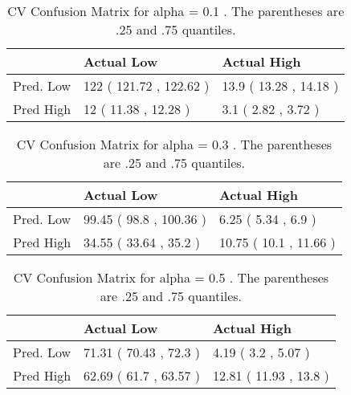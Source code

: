 \begin{table}[H]
\begin{center}
\begin{tabular}{rll}
  \hline
 & Actual Low & Actual High \\ 
  \hline
Pred. Low & 122 ( 121.72 , 122.62 ) & 13.9 ( 13.28 , 14.18 ) \\ 
  Pred High & 12 ( 11.38 , 12.28 ) & 3.1 ( 2.82 , 3.72 ) \\ 
   \hline
\end{tabular}
\caption{CV Confusion Matrix for alpha = 0.1 . The parentheses are .25 and .75 quantiles.}
\end{center}
\end{table}
\begin{table}[H]
\begin{center}
\begin{tabular}{rll}
  \hline
 & Actual Low & Actual High \\ 
  \hline
Pred. Low & 99.45 ( 98.8 , 100.36 ) & 6.25 ( 5.34 , 6.9 ) \\ 
  Pred High & 34.55 ( 33.64 , 35.2 ) & 10.75 ( 10.1 , 11.66 ) \\ 
   \hline
\end{tabular}
\caption{CV Confusion Matrix for alpha = 0.3 . The parentheses are .25 and .75 quantiles.}
\end{center}
\end{table}
\begin{table}[H]
\begin{center}
\begin{tabular}{rll}
  \hline
 & Actual Low & Actual High \\ 
  \hline
Pred. Low & 71.31 ( 70.43 , 72.3 ) & 4.19 ( 3.2 , 5.07 ) \\ 
  Pred High & 62.69 ( 61.7 , 63.57 ) & 12.81 ( 11.93 , 13.8 ) \\ 
   \hline
\end{tabular}
\caption{CV Confusion Matrix for alpha = 0.5 . The parentheses are .25 and .75 quantiles.}
\end{center}
\end{table}
